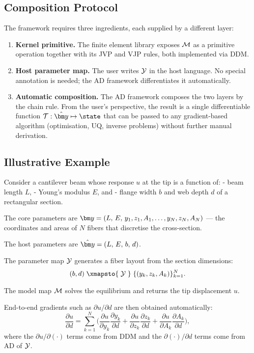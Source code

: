 \subsection{Composition Protocol}
  The framework requires three ingredients, each supplied by a
  different layer:

  \begin{enumerate}
      \item \textbf{Kernel primitive.}
            The finite element library exposes $\mathcal{M}$ as a
            primitive operation together with its JVP and VJP rules,
            both implemented via DDM.

      \item \textbf{Host parameter map.}
            The user writes $\mathcal{Y}$ in the host language.
            No special annotation is needed; the AD framework
            differentiates it automatically.

      \item \textbf{Automatic composition.}
            The AD framework composes the two layers by the chain
            rule.  From the user's perspective, the result is a
            single differentiable function
            $\Tmap : \haty \mapsto \state$ that can be passed to
            any gradient-based algorithm (optimisation, UQ,
            inverse problems) without further manual derivation.
  \end{enumerate}

\subsection{Illustrative Example}
  Consider a cantilever beam whose response $u$ at the tip is a
  function of:
    - beam length $L$,
    - Young's modulus $E$, and
    - flange width $b$ and web depth $d$ of a rectangular section.

  The core parameters are $\corey = (L,\, E,\, y_1, z_1, A_1,
  \ldots, y_N, z_N, A_N)$ — the coordinates and areas of $N$
  fibers that discretise the cross-section.

  The host parameters are $\haty = (L,\, E,\, b,\, d)$.

  The parameter map $\mathcal{Y}$ generates a fiber layout from the
  section dimensions:
  \[
      (b,d) \;\xmapsto{\;\Ymap\;}\;
      \{(y_k, z_k, A_k)\}_{k=1}^{N}.
  \]

  The model map $\mathcal{M}$ solves the equilibrium and returns the tip
  displacement $u$.

  End-to-end gradients such as $\partial u/\partial d$ are then
  obtained automatically:
  \[
      \frac{\partial u}{\partial d}
      = \sum_{k=1}^{N}
        \biggl(
          \frac{\partial u}{\partial y_k}\frac{\partial y_k}{\partial d}
        + \frac{\partial u}{\partial z_k}\frac{\partial z_k}{\partial d}
        + \frac{\partial u}{\partial A_k}\frac{\partial A_k}{\partial d}
        \biggr),
  \]
  where the $\partial u/\partial(\cdot)$ terms come from DDM and
  the $\partial(\cdot)/\partial d$ terms come from AD of $\mathcal{Y}$.